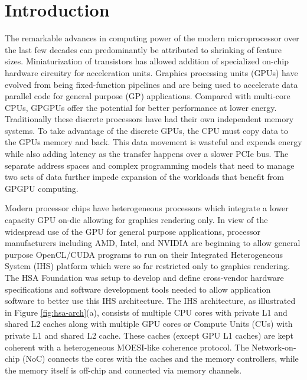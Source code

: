 \section{Introduction}\label{introduction}



\par The remarkable advances in computing power of the modern microprocessor over the last few decades can predominantly be attributed to shrinking of feature sizes. Miniaturization of transistors has allowed addition of specialized on-chip hardware circuitry for acceleration units. 
Graphics processing units (GPUs) have evolved from being fixed-function pipelines and are being used to accelerate data parallel code for general purpose (GP) applications. Compared with multi-core CPUs, GPGPUs offer the potential for better performance at lower energy. Traditionally these discrete processors have had their own independent memory systems. To take advantage of the discrete GPUs, the CPU must copy data to the GPUs memory and back. This data movement is wasteful and expends energy while also adding latency as the transfer happens over a slower PCIe bus. The separate address spaces and complex programming models that need to manage two sets of data further impede expansion of the workloads that benefit from GPGPU computing. 

\par Modern processor chips have heterogeneous processors which integrate a lower capacity GPU on-die allowing for graphics rendering only. In view of the widespread use of the GPU for general purpose applications, processor manufacturers including AMD\cite{amd-apu}, Intel\cite{inteliris}, and NVIDIA\cite{denver} are beginning to allow general purpose OpenCL\cite{opencl}/CUDA\cite{cuda} programs to run on their Integrated Heterogeneous System (IHS) platform which were so far restricted only to graphics rendering. The HSA Foundation \cite{hsafoundation} was setup to develop and define cross-vendor hardware specifications and software development tools needed to allow application software to better use this IHS architecture. 
The IHS architecture, as illustrated in Figure \ref{fig:hsa-arch}(a), consists of multiple CPU cores with private L1 and shared L2 caches along with multiple GPU cores or Compute Units (CUs) with private L1 and shared L2 cache. These caches (except GPU L1 caches) are kept coherent with a heterogeneous MOESI-like coherence protocol. The Network-on-chip (NoC) connects the cores with the caches and the memory controllers, while the memory itself is off-chip and connected via memory channels.


